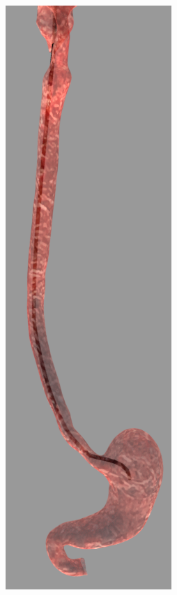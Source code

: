 \documentclass[12pt,a4]{article}
\begin{document}
\begin{figure}[ht!]
\begin{subfigure}{0.15\textwidth}
    \end{subfigure}%
		~   
       \begin{subfigure}{0.15\textwidth}
        \centering
        \includegraphics[width=0.75\linewidth]{figures/GIsnaps/4.png}
       

\end{subfigure}
\end{figure}
\end{document}
